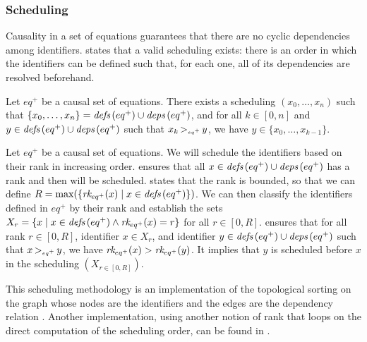 \subsubsection{Scheduling}
\label{sec:semantics:grsync:causality:scheduling}

Causality in a set of equations guarantees that there are no cyclic dependencies among identifiers.
 states that a valid scheduling exists: there is an
order in which the identifiers can be defined such that, for each one, all of its dependencies are
resolved beforehand.

\begin{proposition}
    \label{prop:semantics:grsync:causality:scheduling}
    Let $eq^+$ be a causal set of equations. There exists a
    scheduling $(x_0, \dots, x_n)$ such that $\{x_0, \dots, x_n\} = \defs{eq^+} \cup \deps{eq^+}$,
    and for all $k \in [0, n]$ and $y \in \defs{eq^+} \cup \deps{eq^+}$ such that
    $\depOrd{eq^+}{x_k}{y}$, we have $y \in \{x_0, \dots, x_{k-1}\}$.
\end{proposition}
\begin{skippableproof}
    Let $eq^+$ be a causal set of equations. We will schedule the identifiers based on their rank in
    increasing order.
     ensures that all
    $x \in \defs{eq^+} \cup \deps{eq^+}$ has a rank and then will be scheduled.
     states that the rank is bounded, so that we
    can define $R = \text{max}(\{\rank{eq^+}{x} \mid x \in \defs{eq^+}\})$.
    We can then classify the identifiers defined in $eq^+$ by their rank and establish the sets
    $X_r = \{x \mid x \in \defs{eq^+} \wedge \rank{eq^+}{x} = r\}$ for all $r \in [0, R]$.
     ensures that for all rank $r \in [0, R]$,
    identifier $x \in X_r$, and identifier $y \in \defs{eq^+} \cup \deps{eq^+}$ such that
    $\depOrd{eq^+}{x}{y}$, we have $\rank{eq^+}{x} > \rank{eq^+}{y}$. It implies that $y$ is
    scheduled before $x$ in the scheduling $(X_{r \in [0, R]})$.
\end{skippableproof}

\begin{remark}
    This scheduling methodology is an implementation of the topological sorting on the graph whose
    nodes are the identifiers and the edges are the dependency relation .
    Another implementation, using another notion of rank that loops on the direct computation of the
    scheduling order, can be found in \cite{izerrouken:hal-02270296}.
\end{remark}
